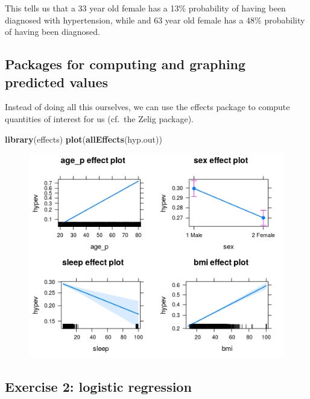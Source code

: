 \documentclass[]{book}
\newenvironment{Shaded}{\begin{snugshade}}{\end{snugshade}}
\newcommand{\KeywordTok}[1]{\textcolor[rgb]{0.13,0.29,0.53}{\textbf{#1}}}
\newcommand{\NormalTok}[1]{#1}
\begin{document}
This tells us that a 33 year old female has a 13\% probability of having
been diagnosed with hypertension, while and 63 year old female has a
48\% probability of having been diagnosed.

\subsection{Packages for computing and graphing predicted
values}\label{packages-for-computing-and-graphing-predicted-values}

Instead of doing all this ourselves, we can use the effects package to
compute quantities of interest for us (cf.~the Zelig package).

\begin{Shaded}
\begin{Highlighting}[]
  \KeywordTok{library}\NormalTok{(effects)}
  \KeywordTok{plot}\NormalTok{(}\KeywordTok{allEffects}\NormalTok{(hyp.out))}
\end{Highlighting}
\end{Shaded}

\begin{figure}
\centering
\includegraphics{R/Rmodels/images/effects1.png}
\caption{}
\end{figure}

\subsection{Exercise 2: logistic
regression}\label{exercise-2-logistic-regression}
\end{document}
